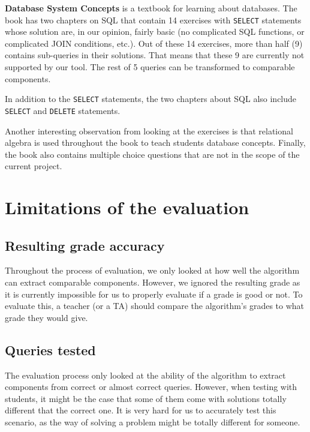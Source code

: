 \textbf{Database System Concepts} is a textbook for learning about databases. The book has two chapters on SQL that contain 14 exercises with \texttt{SELECT} statements whose solution are, in our opinion, fairly basic (no complicated SQL functions, or complicated JOIN conditions, etc.). Out of these 14 exercises, more than half (9) contains sub-queries in their solutions. That means that these 9 are currently not supported by our tool. The rest of 5 queries can be transformed to comparable components.

In addition to the \texttt{SELECT} statements, the two chapters about SQL also include \texttt{SELECT} and \texttt{DELETE} statements.

Another interesting observation from looking at the exercises is that relational algebra is used throughout the book to teach students database concepts. Finally, the book also contains multiple choice questions that are not in the scope of the current project.

\section{Limitations of the evaluation}
\subsection{Resulting grade accuracy}
Throughout the process of evaluation, we only looked at how well the algorithm can extract comparable components. However, we ignored the resulting grade as it is currently impossible for us to properly evaluate if a grade is good or not. To evaluate this, a teacher (or a TA) should compare the algorithm's grades to what grade they would give.

\subsection{Queries tested}
The evaluation process only looked at the ability of the algorithm to extract components from correct or almost correct queries. However, when testing with students, it might be the case that some of them come with solutions totally different that the correct one. It is very hard for us to accurately test this scenario, as the way of solving a problem might be totally different for someone.